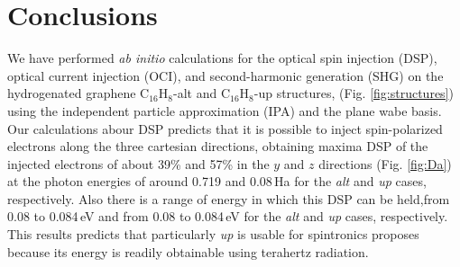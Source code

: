 \documentclass[pss]{wiley2sp} %
\begin{document}


\section{Conclusions}\label{sec:conclusions}

We have performed \emph{ab initio} calculations for the optical spin injection (DSP), optical current injection (OCI), and second-harmonic generation (SHG) on the hydrogenated graphene C$_{16}$H$_{8}$-alt and C$_{16}$H$_{8}$-up structures, (Fig. \ref{fig:structures}) using the independent particle approximation (IPA) and the plane wabe basis. Our calculations abour DSP predicts that it is possible to inject spin-polarized electrons along the three cartesian directions, obtaining maxima DSP of the injected electrons of about 39\% and 57\% in the $y$ and $z$ directions  (Fig. \ref{fig:Da}) at the photon energies of around 0.719 and 0.08\,Ha  for the \emph{alt} and \emph{up} cases, respectively. Also there is a range of energy in which this DSP can be held,{\changed from 0.08 to 0.084\,eV and from 0.08 to 0.084\,eV for the \emph{alt} and \emph{up} cases, respectively}. This results predicts that particularly \emph{up} is usable for spintronics proposes because its energy is readily obtainable using terahertz radiation.
\end{document}

